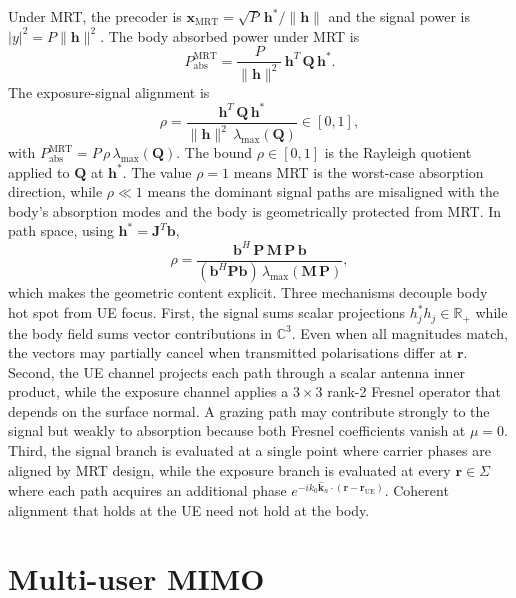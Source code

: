 \documentclass[journal,twocolumn,10pt]{IEEEtran}
\theoremstyle{plain}
\theoremstyle{remark}
\newcommand{\khat}{\hat{\bm{k}}}
\newcommand{\rr}{\mathbf{r}}
\newcommand{\xx}{\mathbf{x}}
\newcommand{\hh}{\mathbf{h}}
\newcommand{\bvec}{\mathbf{b}}
\newcommand{\Qmat}{\mathbf{Q}}
\newcommand{\Mmat}{\mathbf{M}}
\newcommand{\Jmat}{\mathbf{J}}
\newcommand{\Pmat}{\mathbf{P}}
\newcommand{\Complex}{\mathbb{C}}
\begin{document}
Under MRT, the precoder is $\xx_{\mathrm{MRT}} = \sqrt{P}\,\hh^* /
\|\hh\|$ and the signal power is $|y|^2 = P \|\hh\|^2$. The body
absorbed power under MRT is
\begin{equation}\label{eq:Pabs-MRT}
  P_{\mathrm{abs}}^{\mathrm{MRT}}
  = \frac{P}{\|\hh\|^2}\,\hh^T\,\Qmat\,\hh^*.
\end{equation}
The exposure-signal alignment is
\begin{equation}\label{eq:rho-def}
  \rho = \frac{\hh^T\,\Qmat\,\hh^*}{\|\hh\|^2\,\lambda_{\max}(\Qmat)}
  \in [0, 1],
\end{equation}
with $P_{\mathrm{abs}}^{\mathrm{MRT}} = P\,\rho\,\lambda_{\max}(\Qmat)$.
The bound $\rho \in [0, 1]$ is the Rayleigh quotient applied to
$\Qmat$ at $\hh^*$. The value $\rho = 1$ means MRT is the worst-case
absorption direction, while $\rho \ll 1$ means the dominant signal
paths are misaligned with the body's absorption modes and the body
is geometrically protected from MRT. In path space, using
$\hh^* = \Jmat^T \bvec$,
\begin{equation}\label{eq:rho-path}
  \rho = \frac{\bvec^H\,\Pmat\,\Mmat\,\Pmat\,\bvec}
  {(\bvec^H \Pmat \bvec)\,\lambda_{\max}(\Mmat\,\Pmat)},
\end{equation}
which makes the geometric content explicit. Three mechanisms
decouple body hot spot from UE focus. First, the signal sums scalar
projections $h_j^* h_j \in \mathbb{R}_+$ while the body field sums
vector contributions in $\Complex^3$. Even when all
magnitudes match, the vectors may partially cancel when transmitted
polarisations differ at $\rr$. Second, the UE channel projects each
path through a scalar antenna inner product, while the exposure
channel applies a $3 \times 3$ rank-2 Fresnel operator that depends
on the surface normal. A grazing path may contribute strongly to
the signal but weakly to absorption because both Fresnel coefficients
vanish at $\mu = 0$. Third, the signal branch is evaluated at a
single point where carrier phases are aligned by MRT design, while
the exposure branch is evaluated at every $\rr \in \Sigma$ where
each path acquires an additional phase $e^{-i k_0 \khat_n \cdot
(\rr - \rr_{\mathrm{UE}})}$. Coherent alignment that holds at the
UE need not hold at the body.


\section{Multi-user MIMO}\label{sec:mu}
\end{document}
